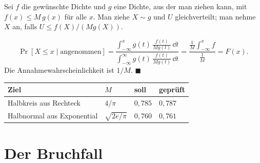 \begin{merksatz}
Sei $f$ die gewünschte Dichte und $g$ eine Dichte, aus der man ziehen kann, mit $f(x) \le M\,g(x)$ für alle $x$. Man ziehe $X \sim g$ und $U$ gleichverteilt; man nehme $X$ an, falls $U \le f(X)/(M g(X))$.

\[ \Pr[X \le x \mid \text{angenommen}] = \frac{\int_{-\infty}^{x} g(t)\,\frac{f(t)}{Mg(t)}\,\dd t}{\int_{-\infty}^{\infty} g(t)\,\frac{f(t)}{Mg(t)}\,\dd t} = \frac{\frac1M\int_{-\infty}^{x} f}{\frac1M} = F(x) . \]
Die Annahmewahrscheinlichkeit ist $1/M$. $\blacksquare$

\begin{center}
{\small
\renewcommand{\arraystretch}{1.48}
\begin{tabular}{@{}P{3.2cm}P{1.6cm}P{1.8cm}P{1.8cm}@{}}
\toprule
\textbf{Ziel} & $M$ & \textbf{soll} & \textbf{geprüft}\\
\midrule
Halbkreis aus Rechteck & $4/\pi$ & $0{,}785$ & $0{,}787$\\
Halbnormal aus Exponential & $\sqrt{2e/\pi}$ & $0{,}760$ & $0{,}761$\\
\bottomrule
\end{tabular}}
\end{center}

\begin{center}
\begin{minipage}{0.88\textwidth}
\end{minipage}
\end{center}
\end{merksatz}

\section{Der Bruchfall}

